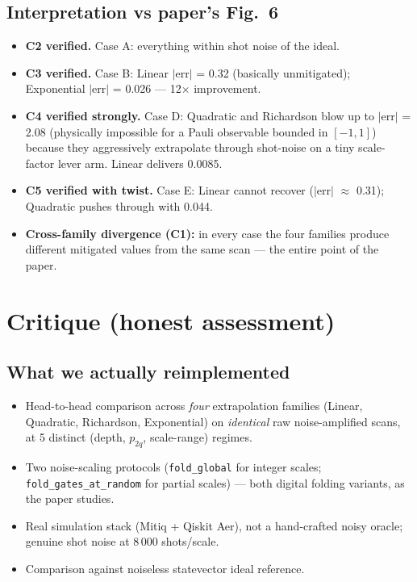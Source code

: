 \documentclass[11pt]{article}
\begin{document}
\subsection{Interpretation vs paper's Fig.~6}
\begin{itemize}
  \item \textbf{C2 verified.} Case A: everything within shot noise of the ideal.
  \item \textbf{C3 verified.} Case B: Linear $|$err$|$ = 0.32 (basically unmitigated);
        Exponential $|$err$|$ = 0.026 --- 12$\times$ improvement.
  \item \textbf{C4 verified strongly.} Case D: Quadratic and Richardson blow up to
        $|$err$|$ = 2.08 (physically impossible for a Pauli observable bounded in
        $[-1, 1]$) because they aggressively extrapolate through shot-noise on a
        tiny scale-factor lever arm. Linear delivers 0.0085.
  \item \textbf{C5 verified with twist.} Case E: Linear cannot recover
        ($|$err$|$ $\approx$ 0.31); Quadratic pushes through with 0.044.
  \item \textbf{Cross-family divergence (C1):} in every case the four families
        produce different mitigated values from the same scan --- the entire
        point of the paper.
\end{itemize}

\section{Critique (honest assessment)}

\subsection{What we actually reimplemented}
\begin{itemize}
  \item Head-to-head comparison across \emph{four} extrapolation families
        (Linear, Quadratic, Richardson, Exponential) on \emph{identical}
        raw noise-amplified scans, at 5 distinct (depth, $p_{2q}$, scale-range)
        regimes.
  \item Two noise-scaling protocols (\texttt{fold\_global} for integer scales;
        \texttt{fold\_gates\_at\_random} for partial scales) --- both digital
        folding variants, as the paper studies.
  \item Real simulation stack (Mitiq + Qiskit Aer), not a hand-crafted noisy
        oracle; genuine shot noise at 8\,000 shots/scale.
  \item Comparison against noiseless statevector ideal reference.
\end{itemize}
\end{document}
